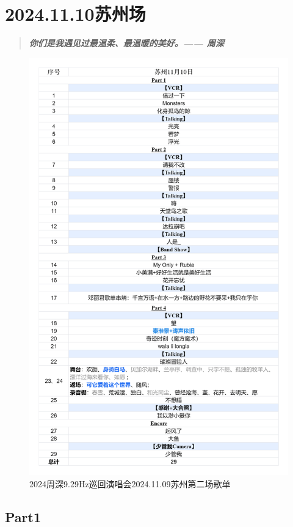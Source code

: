 \documentclass[]{ctexbook}
\begin{document}
\chapter{2024.11.10苏州场}\label{suzhou-20241110}

\begin{quote}
\textbf{\emph{你们是我遇见过最温柔、最温暖的美好。------ 周深}}
\end{quote}

\begin{figure}

{\centering \includegraphics[width=320pt]{img/playlists/playlists-suzhou-20241110} 

}

\caption{2024周深9.29Hz巡回演唱会2024.11.09苏州第二场歌单}\label{fig:unnamed-chunk-132}
\end{figure}

\newpage

\section{Part1}\label{suzhou-20241110-part1}
\end{document}
